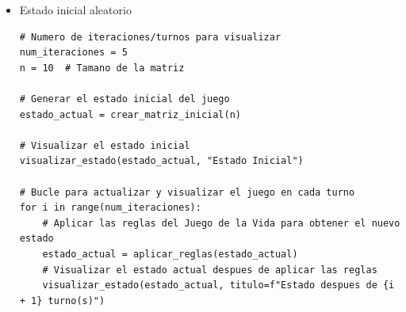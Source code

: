 \begin{itemize}
    \item Estado inicial aleatorio\\

\begin{lstlisting}
# Numero de iteraciones/turnos para visualizar
num_iteraciones = 5
n = 10  # Tamano de la matriz

# Generar el estado inicial del juego
estado_actual = crear_matriz_inicial(n)

# Visualizar el estado inicial
visualizar_estado(estado_actual, "Estado Inicial")

# Bucle para actualizar y visualizar el juego en cada turno
for i in range(num_iteraciones):
    # Aplicar las reglas del Juego de la Vida para obtener el nuevo estado
    estado_actual = aplicar_reglas(estado_actual)
    # Visualizar el estado actual despues de aplicar las reglas
    visualizar_estado(estado_actual, titulo=f"Estado despues de {i + 1} turno(s)")
\end{lstlisting}


\end{itemize}
